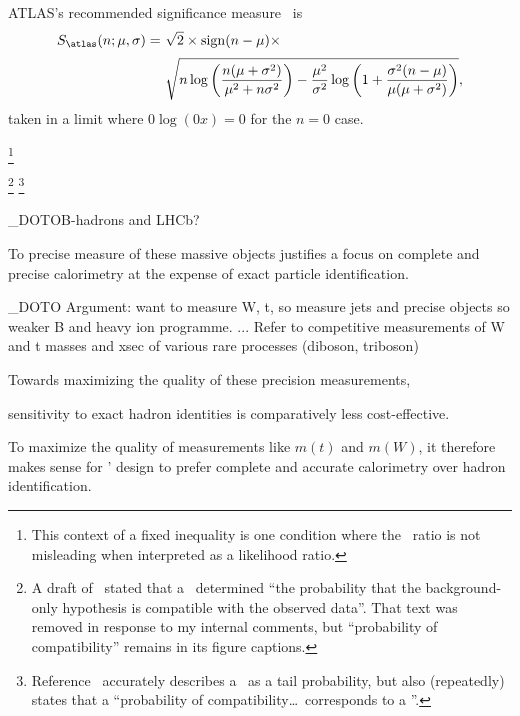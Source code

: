 ATLAS's recommended significance measure~\cite{atlas_significance} is
\begin{align}
\label{eqn:significance_atlas}
S_\mathrm{\atlas}(n; \mu, \sigma) =~&
\sqrt{2} \times
\mathrm{sign}(n - \mu) \times
\\[0.2em] \nonumber
&
\sqrt{
n\log\left(\frac{n(\mu + \sigma^2)}{\mu^2 + n\sigma^2}\right)
- \frac{\mu^2}{\sigma^2}\log\left(
1 + \frac{\sigma^2(n - \mu)}{\mu(\mu + \sigma^2)}
\right)
}
,
\end{align}
taken in a limit where $0\log(0x) = 0$ for the $n=0$ case.


%
\footnote{%
This context of a fixed inequality is one condition where the
\pvalue\ ratio is not misleading when interpreted as a likelihood ratio.%
}


%
\footnote{%
A draft of~\cite{HIGG-2018-51} stated that a \pvalue\ determined
``the probability that the background-only hypothesis is compatible with the
observed data''.
That text was removed in response to my internal comments, but
``probability of compatibility'' remains in its figure captions.%
}%
\footnote{%
Reference~\cite{HIGG-2018-57} accurately describes a \pvalue\ as a tail
probability, but also (repeatedly) states that a
``probability of compatibility\ldots\ corresponds to a \pvalue''.%
}%


\NO_DOTO{B-hadrons and LHCb?}


To precise measure of these massive objects
justifies a focus on complete and precise calorimetry
at the expense of exact particle identification.

\NO_DOTO{
Argument:
want to measure W, t,
so measure jets and precise objects
so weaker B and heavy ion programme.
...
Refer to competitive measurements of W and t masses
and xsec of various rare processes (diboson, triboson)
}


Towards maximizing the quality of these precision measurements,


sensitivity to
exact hadron identities is comparatively less cost-effective.%


To maximize the quality of measurements like $m(t)$ and $m(W)$, it therefore
makes sense for \atlas' design to prefer complete and accurate calorimetry over
hadron identification.


